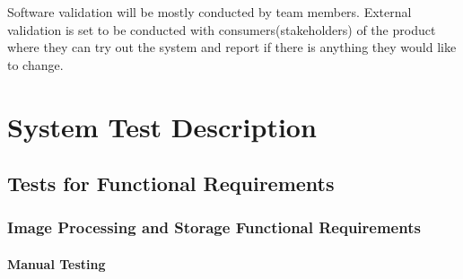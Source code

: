 \documentclass[12pt, titlepage]{article}
\begin{document}
Software validation will be mostly conducted by team members. External validation is set to be conducted with consumers(stakeholders) of the product where they can try out the system and report if there is anything they would like to change.

\section{System Test Description}
	
\subsection{Tests for Functional Requirements}

\subsubsection{Image Processing and Storage Functional Requirements}
		
\paragraph{Manual Testing}
\end{document}
